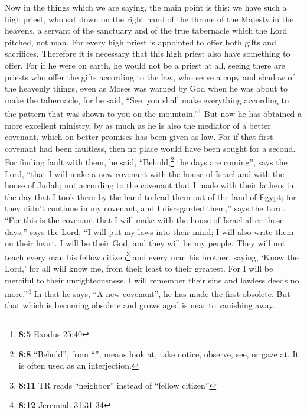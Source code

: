  Now in the things which we are saying, the main point is
this: we have such a high priest, who sat down on the right hand of the
throne of the Majesty in the heavens,  a servant of the
sanctuary and of the true tabernacle which the Lord pitched, not man.
 For every high priest is appointed to offer both gifts
and sacrifices. Therefore it is necessary that this high priest also
have something to offer.  For if he were on earth, he
would not be a priest at all, seeing there are priests who offer the
gifts according to the law,  who serve a copy and shadow
of the heavenly things, even as Moses was warned by God when he was
about to make the tabernacle, for he said, ``See, you shall make
everything according to the pattern that was shown to you on the
mountain.''\footnote{\textbf{8:5} Exodus 25:40}  But now
he has obtained a more excellent ministry, by as much as he is also the
mediator of a better covenant, which on better promises has been given
as law.  For if that first covenant had been faultless,
then no place would have been sought for a second.  For
finding fault with them, he said, ``Behold,\footnote{\textbf{8:8}
  ``Behold'', from ``'', means look at, take notice,
  observe, see, or gaze at. It is often used as an interjection.} the
days are coming'', says the Lord, ``that I will make a new covenant with
the house of Israel and with the house of Judah;  not
according to the covenant that I made with their fathers in the day that
I took them by the hand to lead them out of the land of Egypt; for they
didn't continue in my covenant, and I disregarded them,'' says the Lord.
 ``For this is the covenant that I will make with the
house of Israel after those days,'' says the Lord: ``I will put my laws
into their mind; I will also write them on their heart. I will be their
God, and they will be my people.  They will not teach
every man his fellow citizen\footnote{\textbf{8:11} TR reads
  ``neighbor'' instead of ``fellow citizen''} and every man his brother,
saying, `Know the Lord,' for all will know me, from their least to their
greatest.  For I will be merciful to their
unrighteousness. I will remember their sins and lawless deeds no
more.''\footnote{\textbf{8:12} Jeremiah 31:31-34}  In
that he says, ``A new covenant'', he has made the first obsolete. But
that which is becoming obsolete and grows aged is near to vanishing
away.

